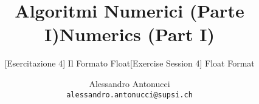 \documentclass[professionalfonts]{beamer}
\title{Algoritmi Numerici (Parte I)}
\subtitle{[Esercitazione 4] Il Formato Float}
\title{Numerics (Part I)}
\subtitle{[Exercise Session 4] Float Format}
\date{}
\author{Alessandro Antonucci\\{\tt alessandro.antonucci@supsi.ch}}
\newif\ifanswers
\begin{document}
\maketitle
\begin{comment}
\frame{\frametitle{\ifanswers I numeri reali\else Real numbers\fi}
\setstretch{1.4}
\begin{itemize}
\ifanswers
\item Operazioni con risultato irrazionale (es. $\sqrt{2}$)
\item Si allarga l'insieme $\mathbb{Q}$ a $\mathbb{R}$ \evi{insieme numeri reali}
\item Diversamente da $\mathbb{Q}$, elementi $\mathbb{R}$ infinit\`a non contabile 
\item Corrispondenza con i punti di un asse (cartesiano)
\else
\item Irrational output for some operations(ex. $\sqrt{2}$)
\item Expanding the set from $\mathbb{Q}$ to $\mathbb{R}$ \evi{real numbers set}
\item Unlike $\mathbb{Q}$, elements of $\mathbb{R}$ are uncountable infinity
\item Corrispondence with the point of a (Cartesian) axis
\fi
\vskip 5mm
\begin{center}
\begin{tikzpicture}[scale=1.5]
\draw[->,thick] (-3,0) -- (3,0);
\draw[below,thick] (0,.2) -- (0,-.2) node[] {\small 0};
\draw[below,thick,color=blue!70] (-1,.2) -- (-1,-.2) node[color=blue!70] {\small $-1$};
\draw[below,thick,color=blue!70] (1,.2) -- (1,-.2) node[color=blue!70] {\small $1$};
\draw[below,thick,color=blue!70] (2,.2) -- (2,-.2) node[color=blue!70] {\small $2$};
\draw[below,thick,color=blue!70] (1.4,.2) -- (1.4,-.2) node[color=blue!70] {\small $\sqrt{2}$};
\end{tikzpicture}
\end{center}
\end{itemize}}


\end{comment}
\end{document}

